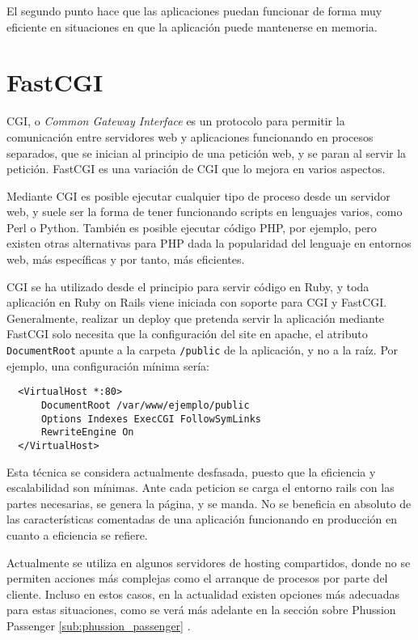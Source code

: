 El segundo punto hace que las aplicaciones puedan funcionar de forma muy eficiente en situaciones en que la aplicación puede mantenerse en memoria.


\section{FastCGI} %
\label{sub:fastcgi}

CGI, o \emph{Common Gateway Interface} es un protocolo para permitir la comunicación entre servidores web y aplicaciones funcionando en procesos separados, que se inician al principio de una petición web, y se paran al servir la petición. FastCGI es una variación de CGI que lo mejora en varios aspectos.

Mediante CGI es posible ejecutar cualquier tipo de proceso desde un servidor web, y suele ser la forma de tener funcionando scripts en lenguajes varios, como Perl o Python. También es posible ejecutar código PHP, por ejemplo, pero existen otras alternativas para PHP dada la popularidad del lenguaje en entornos web, más específicas y por tanto, más eficientes.

CGI se ha utilizado desde el principio para servir código en Ruby, y toda aplicación en Ruby on Rails viene iniciada con soporte para CGI y FastCGI. Generalmente, realizar un deploy que pretenda servir la aplicación mediante FastCGI solo necesita que la configuración del site en apache, el atributo \texttt{DocumentRoot} apunte a la carpeta \texttt{/public} de la aplicación, y no a la raíz. Por ejemplo, una configuración mínima sería:

\begin{verbatim}
  <VirtualHost *:80>
      DocumentRoot /var/www/ejemplo/public
      Options Indexes ExecCGI FollowSymLinks
      RewriteEngine On
  </VirtualHost>
\end{verbatim}

Esta técnica se considera actualmente desfasada, puesto que la eficiencia y escalabilidad son mínimas. Ante cada peticion se carga el entorno rails con las partes necesarias, se genera la página, y se manda. No se beneficia en absoluto de las características comentadas de una aplicación funcionando en producción en cuanto a eficiencia se refiere.

Actualmente se utiliza en algunos servidores de hosting compartidos, donde no se permiten acciones más complejas como el arranque de procesos por parte del cliente. Incluso en estos casos, en la actualidad existen opciones más adecuadas para estas situaciones, como se verá más adelante en la sección sobre Phussion Passenger \ref{sub:phussion_passenger} .

